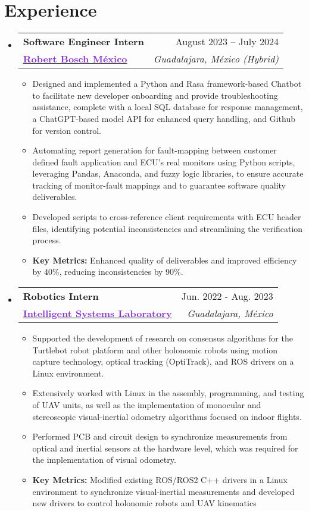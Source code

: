 \documentclass[a4paper,11pt]{article}
\makeatletter
\newcommand{\resumeItem}[1]{
  \item\small{
    {#1 \vspace{-2pt}}
  }
}
\newcommand{\resumeItemNoBullet}[1]{
  \item[]\small{
    {#1 \vspace{-2pt}}
  }
}
\newcommand{\resumeSubheadingNoItalics}[4]{
  \vspace{-2pt}\item
    \begin{tabular*}{1\textwidth}[t]{l@{\extracolsep{\fill}}r}
      \textbf{#1} & #2 \\
      \small#3 & \textit{\small #4} \\
    \end{tabular*}\vspace{-2pt}
}
\newcommand{\resumeSubHeadingListStart}{\begin{itemize}[leftmargin=0in, label={}]}
\newcommand{\resumeSubHeadingListEnd}{\end{itemize}}
\newcommand{\resumeItemListStart}{\begin{itemize}[leftmargin=0.15in, nosep]}
\newcommand{\resumeItemListEnd}{\end{itemize}\vspace{-2pt}}
\makeatother
\begin{document}
\section{\Large{Experience}}
  \resumeSubHeadingListStart
    \resumeSubheadingNoItalics
      {\large Software Engineer Intern}{August 2023 -- July 2024}
      {\href{https://bosch.com.mx}{\textcolor{BlueViolet}{\textbf{\large{Robert Bosch México}}}}}{Guadalajara, México (Hybrid)}
      \resumeItemListStart
        \resumeItem{Designed and implemented a Python and Rasa framework-based Chatbot to facilitate new developer onboarding and provide troubleshooting assistance, complete with a local SQL database for response management, a ChatGPT-based model API for enhanced query handling, and Github for version control.}
        \resumeItem{Automating report generation for fault-mapping between customer defined fault application and ECU's  real monitors using Python scripts, leveraging Pandas, Anaconda, and fuzzy logic libraries, to ensure accurate tracking of monitor-fault mappings and to guarantee software quality deliverables.}
        \resumeItem{Developed scripts to cross-reference client requirements with ECU header files, identifying potential inconsistencies and streamlining the verification process.}
        \resumeItemNoBullet{\textbf{Key Metrics:} Enhanced quality of deliverables and improved efficiency by 40\%, reducing inconsistencies by 90\%.}
      \resumeItemListEnd
    \vspace{-2pt}
    \resumeSubheadingNoItalics
      {\large Robotics Intern}{Jun. 2022 - Aug. 2023}
      {\href{https://www.cucei.udg.mx/carreras/robotica/es/laboratorios/ciber-fisicos}{\textcolor{BlueViolet}{\textbf{\large{Intelligent Systems Laboratory}}}}}{Guadalajara, México}
      \resumeItemListStart
        \resumeItem{Supported the development of research on consensus algorithms for the Turtlebot robot platform and other holonomic robots using motion capture technology, optical tracking (OptiTrack), and ROS drivers on a Linux environment.}
        \resumeItem{Extensively worked with Linux in the assembly, programming, and testing of UAV units, as well as the implementation of monocular and stereoscopic visual-inertial odometry algorithms focused on indoor flights.}
        \resumeItem{Performed PCB and circuit design to synchronize measurements from optical and inertial sensors at the hardware level, which was required for the implementation of visual odometry.}
        \resumeItemNoBullet{\textbf{Key Metrics:} Modified existing ROS/ROS2 C++ drivers in a Linux environment to synchronize visual-inertial measurements and developed new drivers to control holonomic robots and UAV kinematics}
      \resumeItemListEnd
  \resumeSubHeadingListEnd
\vspace{-12pt}
\end{document}
